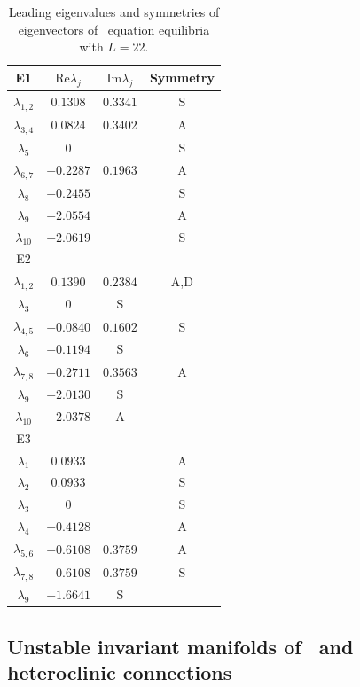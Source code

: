 \begin{table}[!ht]
\caption{\label{tab:E1_sym} Leading eigenvalues and symmetries
of eigenvectors of \KS\ equation equilibria with $L = 22$.}
{\small
\begin{tabular}{cccc} \hline
E1 & $\mathrm{Re} \lambda_j$ & $\mathrm{Im} \lambda_j$ & Symmetry \\\hline
  $\lambda_{1,2}$ & $0.1308$& $0.3341$ & S \\
  $\lambda_{3,4}$ & $0.0824$& $0.3402$ & A \\
  $\lambda_{5}$   & $0$     &          & S \\
  $\lambda_{6,7}$ &$-0.2287$& $0.1963$ & A \\
  $\lambda_{8}$   &$-0.2455$&          & S \\
  $\lambda_{9}$   &$-2.0554$&          & A \\
  $\lambda_{10}$  &$-2.0619$&          & S \\\hline
E2 &  &  & \\\hline
  $\lambda_{1,2}$ & $0.1390$ & $0.2384$ & A,D \\
  $\lambda_{3}$   & $0$                 & S \\
  $\lambda_{4,5}$ &$-0.0840$ & $0.1602$ & S \\
  $\lambda_{6}$   &$-0.1194$            & S \\
  $\lambda_{7,8}$ &$-0.2711$ & $0.3563$ & A \\
  $\lambda_{9}$   &$-2.0130$            & S \\
  $\lambda_{10}$  &$-2.0378$            & A \\\hline
E3 &  &  & \\\hline
  $\lambda_{1}$   &$0.0933$  &          & A \\
  $\lambda_{2}$   &$0.0933$  &          & S \\
  $\lambda_{3}$   &$0$       &          & S \\
  $\lambda_{4}$   &$-0.4128$ &          & A \\
  $\lambda_{5,6}$ &$-0.6108$ & $0.3759$ & A \\
  $\lambda_{7,8}$ &$-0.6108$ & $0.3759$ & S \\
  $\lambda_{9}$   &$-1.6641$            & S \\\hline
\end{tabular}}
\end{table}


\subsection{Unstable invariant manifolds of \eqva\ and heteroclinic
connections}

